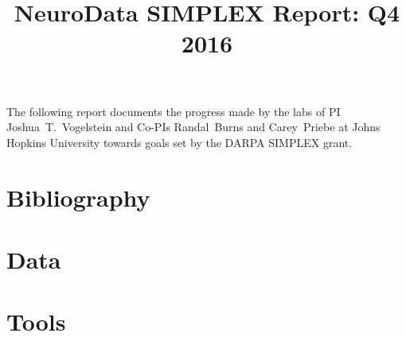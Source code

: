 \documentclass[12pt]{article}
\title{NeuroData SIMPLEX Report: Q4 2016}
\begin{document}
\renewcommand{\onlyinsubfile}[1]{}
\renewcommand{\notinsubfile}[1]{#1}
\maketitle
\thispagestyle{empty}

The following report documents the progress made by the labs of PI Joshua~T.~Vogelstein and Co-PIs Randal~Burns and Carey~Priebe at Johns Hopkins University towards goals set by the DARPA SIMPLEX grant.

\setcounter{tocdepth}{2}
\tableofcontents


\newpage 
\section{Bibliography}
\begin{spacing}{0.5}
{\footnotesize
{}
 
 
}
\end{spacing}

\newpage 
\section{Data}

%


\newpage
\section{Tools}

%



\clearpage

\clearpage

\clearpage


















\newpage
\begin{spacing}{0.5}
{\footnotesize
}
\end{spacing}

\end{document}
